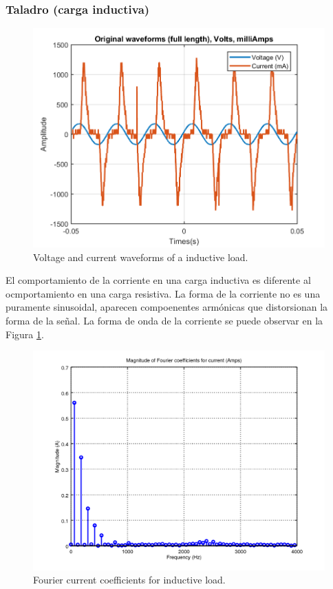 \documentclass[journal]{IEEEtran}
\begin{document}
\subsubsection{Taladro (carga inductiva)}

\begin{figure}[h]
\centering
\includegraphics[clip,width=\columnwidth]
{original_waveform_drill.png}
\caption{Voltage and current waveforms of a inductive load.}
\label{original_inductive_load}
\end{figure}

El comportamiento de la corriente en una carga inductiva 
es diferente al ocmportamiento en una carga resistiva. 
La forma de la corriente no es una puramente sinusoidal,
aparecen compoenentes armónicas que distorsionan la forma 
de la señal. La forma de onda de la corriente
se puede observar en la Figura 
\ref{original_inductive_load}.\\ 

\begin{figure}[h]
\centering
\includegraphics[clip,width=\columnwidth]
{zoomed_current_furier_coefficients_drill.png}
\caption{Fourier current coefficients for inductive load.}
\label{fourier_corrent_coefficients_inductive}
\end{figure}
\end{document}
